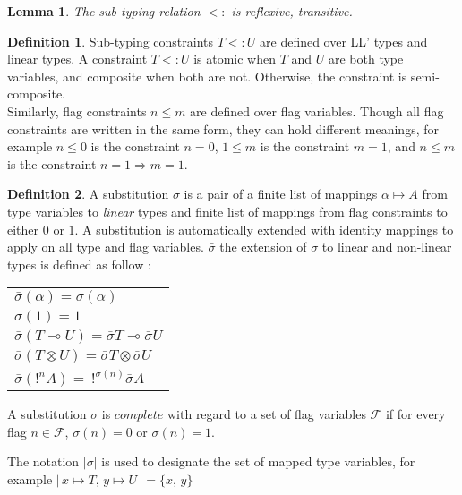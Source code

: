 \documentclass[10pt]{article}
\theoremstyle{plain}
\theoremstyle{definition}
\newtheorem{defn}{Definition}[subsection] %
\newtheorem{lemma}{Lemma}[section]
\begin{document}
\begin{lemma} \it The sub-typing relation $<:$ is reflexive, transitive.
\end{lemma}

\begin{defn} Sub-typing constraints $T <: U$ are defined over LL' types and linear types. A constraint $T <: U$ is atomic
  when $T$ and $U$ are both type variables, and composite when both are not. Otherwise, the constraint is semi-composite. \\
  Similarly, flag constraints $n \le m$ are defined over flag variables. Though all flag constraints are written in the same
  form, they can hold different meanings, for example $n \le 0$ is the constraint $n = 0$, $1 \le m$ is the constraint
  $m = 1$, and $n \le m$ is the constraint $n = 1 \Rightarrow m = 1$.
  
\end{defn}

\begin{defn} A substitution $\sigma$ is a pair of a finite list of mappings $\alpha \mapsto A$ from type variables to
	\textit{linear} types 	and finite list of mappings from flag constraints to either $0$ or $1$.
	A substitution is automatically extended with identity mappings to apply on all type and flag variables.
	$\bar{\sigma}$ the extension of $\sigma$ to linear and non-linear types is defined as follow :
 		\begin{center}
 		\begin{tabular}{l}
 			$\bar{\sigma}(\alpha) = \sigma(\alpha)$ \\
			$\bar{\sigma}(1) = 1$ \\
 			$\bar{\sigma}(T \multimap U) = \bar{\sigma}T \multimap \bar{\sigma}U$ \\
 			$\bar{\sigma}(T \otimes U) = \bar{\sigma}T \otimes \bar{\sigma}U$ \\
 			$\bar{\sigma}(!^n A) = ~ !^{\sigma(n)} \bar{\sigma}A$
 		\end{tabular}
 		\end{center}
 	A substitution $\sigma$ is $\textit{complete}$ with regard to a set of flag variables $\mathcal{F}$ if for every flag $n \in \mathcal{F}$,
 	$\sigma (n) = 0$ or $\sigma (n) = 1$.
 	
 	The notation $|\sigma|$ is used to designate the set of mapped type variables, for example
 	$ | \,x \mapsto T, \, y \mapsto U\,| = \{ x, \,y \} $
\end{defn}
\end{document}
